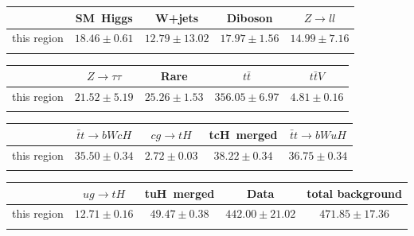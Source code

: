 \centering
\begin{tabular}{ccccc} \toprule\toprule
 & SM~Higgs & W+jets & Diboson & $Z\to ll$\\\midrule
this region & $18.46\pm0.61$ & $12.79\pm13.02$ & $17.97\pm1.56$ & $14.99\pm7.16$\\
\bottomrule\bottomrule\\
\end{tabular}
\begin{tabular}{ccccc} \toprule\toprule
 & $Z\to \tau\tau$ & Rare & $t\bar{t}$ & $t\bar{t}V$\\\midrule
this region & $21.52\pm5.19$ & $25.26\pm1.53$ & $356.05\pm6.97$ & $4.81\pm0.16$\\
\bottomrule\bottomrule\\
\end{tabular}
\begin{tabular}{ccccc} \toprule\toprule
 & $\bar{t}t\to bWcH$ & $cg\to tH$ & tcH~merged & $\bar{t}t\to bWuH$\\\midrule
this region & $35.50\pm0.34$ & $2.72\pm0.03$ & $38.22\pm0.34$ & $36.75\pm0.34$\\
\bottomrule\bottomrule\\
\end{tabular}
\begin{tabular}{ccccc} \toprule\toprule
 & $ug\to tH$ & tuH~merged & Data & total background\\\midrule
this region & $12.71\pm0.16$ & $49.47\pm0.38$ & $442.00\pm21.02$ & $471.85\pm17.36$\\
\bottomrule\bottomrule\\
\end{tabular}

